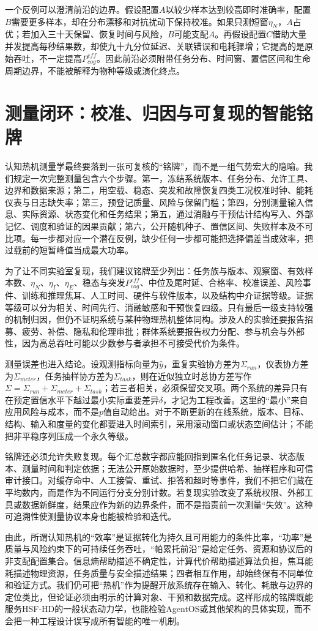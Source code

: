 一个反例可以澄清前沿的边界。假设配置$A$以较少样本达到较高即时准确率，配置$B$需要更多样本，却在分布漂移和对抗扰动下保持校准。如果只测短窗$\eta_N$，$A$占优；若加入三十天保留、恢复时间与风险，$B$可能支配$A$。再假设配置$C$借助大量并发提高每秒结果数，却使九十九分位延迟、关联错误和电耗骤增；它提高的是原始吞吐，不一定提高$P_{cog}^{eff}$。因此前沿必须附带任务分布、时间窗、置信区间和生命周期边界，不能被解释为物种等级或演化终点。

\section{测量闭环：校准、归因与可复现的智能铭牌}

认知热机测量学最终要落到一张可复核的“铭牌”，而不是一组气势宏大的隐喻。我们规定一次完整测量包含六个步骤。第一，冻结系统版本、任务分布、允许工具、边界和数据来源；第二，用空载、稳态、突发和故障恢复四类工况校准时钟、能耗仪表与日志缺失率；第三，预登记质量、风险与保留门槛；第四，分别测量输入信息、实际资源、状态变化和任务结果；第五，通过消融与干预估计结构写入、外部记忆、调度和验证的因果贡献；第六，公开随机种子、置信区间、失败样本及不可比项。每一步都对应一个潜在反例，缺少任何一步都可能把选择偏差当成效率，把过载前的短暂峰值当成最大功率。

为了让不同实验室复现，我们建议铭牌至少列出：任务族与版本、观察窗、有效样本数、$\eta_N$、$\eta_I$、$\eta_E$、稳态与突发$P_{cog}^{eff}$、中位及尾时延、合格率、校准误差、风险事件、训练和推理焦耳、人工时间、硬件与软件版本，以及结构中介证据等级。证据等级可以分为相关、时间先行、消融敏感和干预恢复四级。只有最后一级支持较强的机制归因，但仍不证明系统与某种物理热机整体同构。涉及人的实验还要报告招募、疲劳、补偿、隐私和伦理审批；群体系统要报告权力分配、参与机会与外部性，因为高总吞吐可能以少数参与者承担不可接受代价为条件。

测量误差也进入结论。设观测指标向量为$\hat y$，重复实验协方差为$\Sigma_{run}$，仪表协方差为$\Sigma_{meter}$，任务抽样协方差为$\Sigma_{task}$，则在近似独立时总协方差写作$\Sigma=\Sigma_{run}+\Sigma_{meter}+\Sigma_{task}$；若三者相关，必须保留交叉项。两个系统的差异只有在预定置信水平下越过最小实际重要差异$\delta$，才记为工程改善。这里的“最小”来自应用风险与成本，而不是$p$值自动给出。对于不断更新的在线系统，版本、目标、结构、输入和度量的变化都要进入时间索引，采用滚动窗口或状态空间估计；不能把非平稳序列压成一个永久等级。

铭牌还必须允许失败复现。每个汇总数字都应能回指到匿名化任务记录、状态版本、测量时间和判定依据；无法公开原始数据时，至少提供哈希、抽样程序和可信审计接口。对缓存命中、人工接管、重试、拒答和超时等事件，我们不把它们藏在平均数内，而是作为不同运行分支分别计数。若复现实验改变了系统权限、外部工具或数据新鲜度，结果应作为新的边界条件，而不是指责前一次测量“失效”。这种可追溯性使测量协议本身也能被检验和迭代。

由此，所谓认知热机的“效率”是证据转化为持久且可用能力的条件比率，“功率”是质量与风险约束下的可持续任务吞吐，“帕累托前沿”是给定任务、资源和协议后的非支配配置集合。信息熵帮助描述不确定性，计算代价帮助描述算法负担，焦耳能耗描述物理资源，任务质量与安全描述结果；四者相互作用，却始终保有不同单位和验证方式。我们仍可把“热机”作为提醒开放系统存在输入、转化、耗散与边界的定位类比，但论证必须由明示的计算对象、干预和数据完成。这样形成的铭牌既能服务HSF-HD的一般状态动力学，也能检验AgentOS或其他架构的具体实现，而不会把一种工程设计误写成所有智能的唯一机制。
